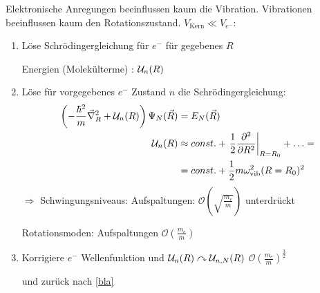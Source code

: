 	Elektronische Anregungen beeinflussen kaum die Vibration. Vibrationen beeinflussen kaum den Rotationszustand. 
	$V_{\mathrm{Kern}} \ll V_{e^-}$:
	\begin{enumerate}[1.]
		\item Löse Schrödingergleichung für $e^-$ für gegebenes $R$
		
			Energien (Molekülterme) : $\mathcal{U}_n(R)$
		\item Löse für vorgegebenes $e^-$ Zustand $n$ die Schrödingergleichung: \label{bla}
				\begin{align*}
					\left( - \frac{\hbar^2}{m} \vec{\nabla}_R^2 + \mathcal{U}_n (R)
					\right)	
					\Psi_N (\vec{R}) &= E_N (\vec{R}) \\
					\mathcal{U}_n (R) &\approx const. + \left.\frac{1}{2} \frac{\partial^2}{\partial R^2}
					\right|_{R=R_0} + \ldots = \\
					&= const. + \frac{1}{2} m \omega_{\mathrm{vib}}^2 (R=R_0)^2 
				\end{align*}
			$\Rightarrow$ Schwingungsniveaus: Aufspaltungen: $\mathscr{O} \left(\sqrt{\frac{m_e}{m}}\right)$ unterdrückt
			
			Rotationsmoden: Aufspaltungen $\mathscr{O} \left(\frac{m_e}{m}\right)$
			
		\item Korrigiere $e^-$ Wellenfunktion und $\mathcal{U}_n(R) \curvearrowright \mathcal{U}_{n,N}(R)$ 
			 $\mathscr{O} \left(\frac{m_e}{m}\right)^{\frac{3}{2}}$ 
			 
			 und zurück nach \ref{bla}
	\end{enumerate}
